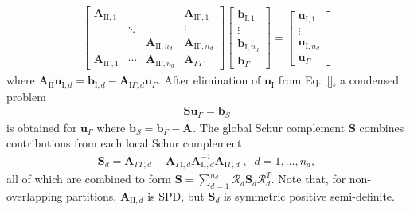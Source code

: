 \documentclass{article}
\begin{document}
\begin{align}
\begin{bmatrix}
\mathbf{A}_{\mathrm{II},1}&&&\mathbf{A}_{\mathrm{I\Gamma},1}\\
&\ddots&& \vdots\\
&&\mathbf{A}_{\mathrm{II},n_d}&\mathbf{A}_{\mathrm{I\Gamma},n_d}\\
\mathbf{A}_{\mathrm{I\Gamma},1}&\cdots&\mathbf{A}_{\mathrm{I\Gamma},n_d}& \mathbf{A}_{\Gamma\Gamma} 
\end{bmatrix}
\begin{bmatrix}
\mathbf{b}_{\mathrm{I},1}\\
\vdots\\
\mathbf{b}_{\mathrm{I},n_d}\\
\mathbf{b}_{\Gamma}
\end{bmatrix}
=
\begin{bmatrix}
\mathbf{u}_{\mathrm{I},1}\\
\vdots\\
\mathbf{u}_{\mathrm{I},n_d}\\
\mathbf{u}_{\Gamma}
\end{bmatrix}
\end{align}
where $\mathbf{A}_{\mathrm{II}}\mathbf{u}_{\mathrm{I},d}=\mathbf{b}_{\mathrm{I},d}-\mathbf{A}_{\mathrm{I}\Gamma,d}\mathbf{u}_{\Gamma}$.
After elimination of $\mathbf{u}_{\mathrm{I}}$ from Eq.~\eqref{}, a condensed problem
\begin{align}
\mathbf{S}\mathbf{u}_{\Gamma}=\mathbf{b}_S
\end{align}
is obtained for $\mathbf{u}_\Gamma$ 
where $\mathbf{b}_S=\mathbf{b}_\Gamma-\mathbf{A}_{}$.
The global Schur complement $\mathbf{S}$ combines contributions from each local Schur complement
\begin{align}
\mathbf{S}_d=
\mathbf{A}_{\Gamma\Gamma,d}-
\mathbf{A}_{\Gamma\mathrm{I},d}\mathbf{A}_{\mathrm{II},d}^{-1}\mathbf{A}_{\mathrm{I}\Gamma,d}
\;,\;\;
d=1,\dots,n_d,
\end{align}
all of which are combined to form $\mathbf{S}=\sum_{d=1}^{n_d}\boldsymbol{\mathcal{R}}_d\mathbf{S}_d\boldsymbol{\mathcal{R}}_d^T$.
Note that, for non-overlapping partitions, $\mathbf{A}_{\mathrm{II},d}$ is SPD, but $\mathbf{S}_{d}$ is symmetric positive semi-definite.
\end{document}
